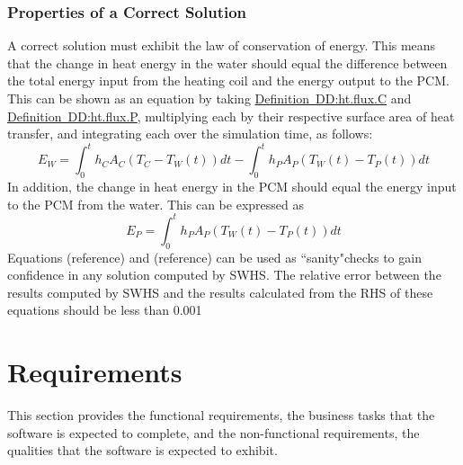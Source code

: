 \documentclass[12pt]{article}
\begin{document}
\subsubsection{Properties of a Correct Solution}
\label{Sec:PropofaCorrSolu}
A correct solution must exhibit the law of conservation of energy. This means that the change in heat energy in the water should equal the difference between the total energy input from the heating coil and the energy output to the PCM. This can be shown as an equation by taking \hyperref[DD:ht.flux.C]{Definition~DD:ht.flux.C} and \hyperref[DD:ht.flux.P]{Definition~DD:ht.flux.P}, multiplying each by their respective surface area of heat transfer, and integrating each over the simulation time, as follows:
\begin{equation}
E_{W}=\int_{0}^{t}{h_{C}A_{C}\left(T_{C}-T_{W}\left(t\right)\right)dt}-\int_{0}^{t}{h_{P}A_{P}\left(T_{W}\left(t\right)-T_{P}\left(t\right)\right)dt}
\end{equation}
In addition, the change in heat energy in the PCM should equal the energy input to the PCM from the water. This can be expressed as
\begin{equation}
E_{P}=\int_{0}^{t}{h_{P}A_{P}\left(T_{W}\left(t\right)-T_{P}\left(t\right)\right)dt}
\end{equation}
Equations (reference) and (reference) can be used as ``sanity"checks to gain confidence in any solution computed by SWHS. The relative error between the results computed by SWHS and the results calculated from the RHS of these equations should be less than 0.001%
\section{Requirements}
\label{Sec:Requ}
This section provides the functional requirements, the business tasks that the software is expected to complete, and the non-functional requirements, the qualities that the software is expected to exhibit.
\end{document}
